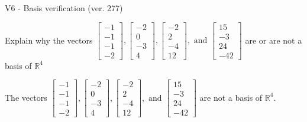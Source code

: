 \begin{exercise}
  \begin{exerciseTitle}V6 - Basis verification (ver. 277)\end{exerciseTitle}
  \begin{exerciseStatement}
    Explain why the vectors \(\left[\begin{array}{r}
-1 \\
-1 \\
-1 \\
-2
\end{array}\right] , \left[\begin{array}{r}
-2 \\
0 \\
-3 \\
4
\end{array}\right] , \left[\begin{array}{r}
-2 \\
2 \\
-4 \\
12
\end{array}\right] , \text{ and } \left[\begin{array}{r}
15 \\
-3 \\
24 \\
-42
\end{array}\right]\) are or are not a basis of \(\mathbb{R}^4\)	


  \end{exerciseStatement}
  \begin{exerciseAnswer}
   The vectors \(\left[\begin{array}{r}
-1 \\
-1 \\
-1 \\
-2
\end{array}\right] , \left[\begin{array}{r}
-2 \\
0 \\
-3 \\
4
\end{array}\right] , \left[\begin{array}{r}
-2 \\
2 \\
-4 \\
12
\end{array}\right] , \text{ and } \left[\begin{array}{r}
15 \\
-3 \\
24 \\
-42
\end{array}\right]\) 
  	 are not  a basis of \(\mathbb{R}^4\).
  


  \end{exerciseAnswer}
\end{exercise}